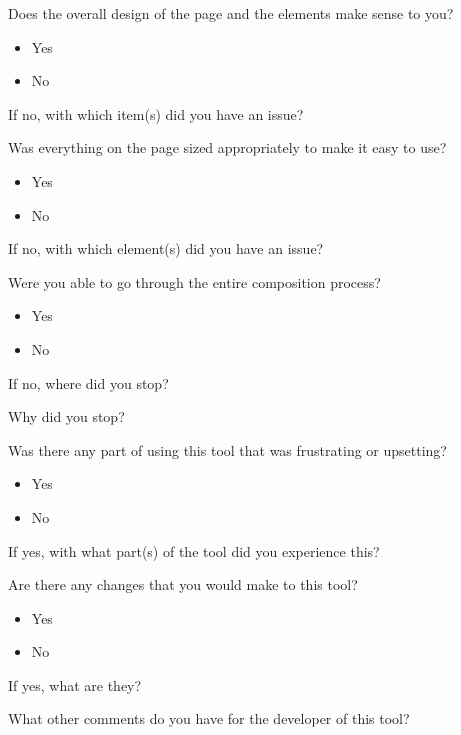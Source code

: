 \noindent Does the overall design of the page and the elements make sense to you?

\begin{itemize}
	\item Yes
	\item No
\end{itemize}

\noindent If no, with which item(s) did you have an issue?

\vspace{\baselineskip}

\noindent Was everything on the page sized appropriately to make it easy to use?

\begin{itemize}
	\item Yes
	\item No
\end{itemize}

\noindent If no, with which element(s) did you have an issue?

\vspace{\baselineskip}

\noindent Were you able to go through the entire composition process?

\begin{itemize}
	\item Yes
	\item No
\end{itemize}

\noindent If no, where did you stop?

\vspace{\baselineskip}

\noindent Why did you stop?

\vspace{\baselineskip}

\noindent Was there any part of using this tool that was frustrating or upsetting?

\begin{itemize}
	\item Yes
	\item No
\end{itemize}

\noindent If yes, with what part(s) of the tool did you experience this?

\vspace{\baselineskip}

\noindent Are there any changes that you would make to this tool?

\begin{itemize}
	\item Yes
	\item No
\end{itemize}

\noindent If yes, what are they?

\vspace{\baselineskip}

\noindent What other comments do you have for the developer of this tool?